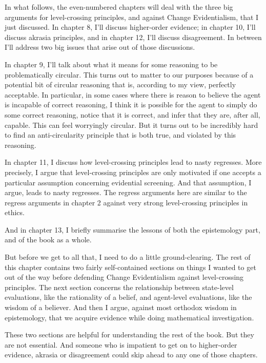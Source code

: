 \documentclass[
  10pt,
  letterpaper,
  twoside]{scrbook}
\begin{document}
In what follows, the even-numbered chapters will deal with the three big
arguments for level-crossing principles, and against Change
Evidentialism, that I just discussed. In chapter 8, I'll discuss
higher-order evidence; in chapter 10, I'll discuss akrasia principles,
and in chapter 12, I'll discuss disagreement. In between I'll address
two big issues that arise out of those discussions.

In chapter 9, I'll talk about what it means for some reasoning to be
problematically circular. This turns out to matter to our purposes
because of a potential bit of circular reasoning that is, according to
my view, perfectly acceptable. In particular, in some cases where there
is reason to believe the agent is incapable of correct reasoning, I
think it is possible for the agent to simply do some correct reasoning,
notice that it is correct, and infer that they are, after all, capable.
This can feel worryingly circular. But it turns out to be incredibly
hard to find an anti-circularity principle that is both true, and
violated by this reasoning.

In chapter 11, I discuss how level-crossing principles lead to nasty
regresses. More precisely, I argue that level-crossing principles are
only motivated if one accepts a particular assumption concerning
evidential screening. And that assumption, I argue, leads to nasty
regresses. The regress arguments here are similar to the regress
arguments in chapter 2 against very strong level-crossing principles in
ethics.

And in chapter 13, I briefly summarise the lessons of both the
epistemology part, and of the book as a whole.

But before we get to all that, I need to do a little ground-clearing.
The rest of this chapter contains two fairly self-contained sections on
things I wanted to get out of the way before defending Change
Evidentialism against level-crossing principles. The next section
concerns the relationship between state-level evaluations, like the
rationality of a belief, and agent-level evaluations, like the wisdom of
a believer. And then I argue, against most orthodox wisdom in
epistemology, that we acquire evidence while doing mathematical
investigation.

These two sections are helpful for understanding the rest of the book.
But they are not essential. And someone who is impatient to get on to
higher-order evidence, akrasia or disagreement could skip ahead to any
one of those chapters.
\end{document}
